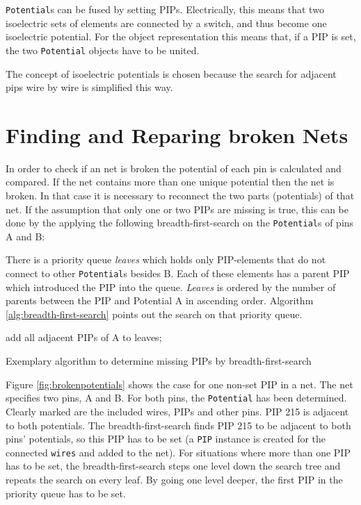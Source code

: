 \texttt{Potential}s can be fused by setting PIPs. Electrically, this means that two isoelectric sets of elements are connected by a switch, and thus become one isoelectric potential. For the object representation this means that, if a PIP is set, the two \texttt{Potential} objects have to be united.

The concept of isoelectric potentials is chosen because the search for adjacent pips wire by wire is simplified this way.


\newpage
\section{Finding and Reparing broken Nets}
\label{sec:findingandrepairingbrokennets}

In order to check if an net is broken the potential of each pin is calculated and compared. If the net contains more than one unique potential then the net is broken.
In that case it is necessary to reconnect the two parts (potentials) of that net. If the assumption that only one or two PIPs are missing is true, this can be done by the applying the following breadth-first-search on the \texttt{Potential}s of pins A and B:

There is a priority queue \textit{leaves} which holds only PIP-elements that do not connect to other \texttt{Potential}s besides B. 
Each of these elements has a parent PIP which introduced the PIP into the queue. \textit{Leaves} is ordered by the number of parents between the PIP and Potential A in ascending order. Algorithm \ref{alg:breadth-first-search} points out the search on that priority queue.

\begin{algorithm}[h!]
	add all adjacent PIPs of A to leaves;\\
 \caption{Exemplary algorithm to determine missing PIPs by breadth-first-search}
 \label{alg:breadth-first-search}
\end{algorithm}


Figure \ref{fig:brokenpotentials} shows the case for one non-set PIP in a net. The net specifies two pins, A and B. For both pins, the \texttt{Potential} has been determined. Clearly marked are the included wires, PIPs and other pins. PIP 215 is adjacent to both potentials. The breadth-first-search finds PIP 215 to be adjacent to both pins' potentials, so this PIP has to be set (a \texttt{PIP} instance is created for the connected \texttt{wires} and added to the net). For situations where more than one PIP has to be set, the breadth-first-search steps one level down the search tree and repeats the search on every leaf. By going one level deeper, the first PIP in the priority queue has to be set.

